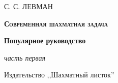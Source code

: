 \begin{titlepage}
\centering
	{\scshape\LARGE С. С. ЛЕВМАН \par}
	\vspace{1cm}
	{\scshape\bfseries\huge\color{red} Современная шахматная задача\par}
	\vspace{1.5cm}
	{\Large\bfseries Популярное руководство\par}
	\vspace{2cm}
	{\Large\itshape\color{red} часть первая\par}

	\vfill

	{\large Издательство ,,Шахматный листок''\par}
\end{titlepage}
